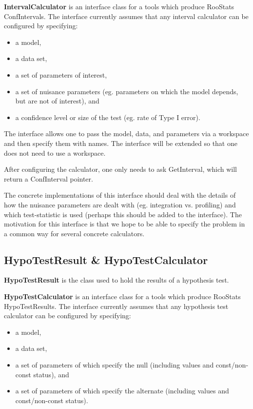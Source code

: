 \documentclass[11pt]{article}
\begin{document}



\textbf{IntervalCalculator} is an interface class for a tools which produce RooStats ConfIntervals.  
The interface currently assumes that any interval calculator can be configured by specifying:
\begin{itemize}
 \item a model,
 \item a data set,
 \item a set of parameters of interest,
 \item a set of nuisance parameters (eg. parameters on which the model depends, but are not of interest), and 
 \item a confidence level or size of the test (eg. rate of Type I error).
\end{itemize}

The interface allows one to pass the model, data, and parameters via a workspace and then specify them with names.
The interface will be extended so that one does not need to use a workspace.

After configuring the calculator, one only needs to ask GetInterval, which will return a ConfInterval pointer.

The concrete implementations of this interface should deal with the details of how the nuisance parameters are
dealt with (eg. integration vs. profiling) and which test-statistic is used (perhaps this should be added to the interface).
The motivation for this interface is that we hope to be able to specify the problem in a common way for several concrete calculators.



\subsection{HypoTestResult \& HypoTestCalculator}
\textbf{HypoTestResult} is the class used to hold the results of a hypothesis test.  


\textbf{HypoTestCalculator} is an interface class for a tools which produce RooStats HypoTestResults.  
The interface currently assumes that any hypothesis test calculator can be configured by specifying:
\begin{itemize}
 \item a model,
 \item a data set,
 \item a set of parameters of which specify the null (including values and const/non-const status), and 
 \item a set of parameters of which specify the alternate (including values and const/non-const status).
\end{itemize}
\end{document}
